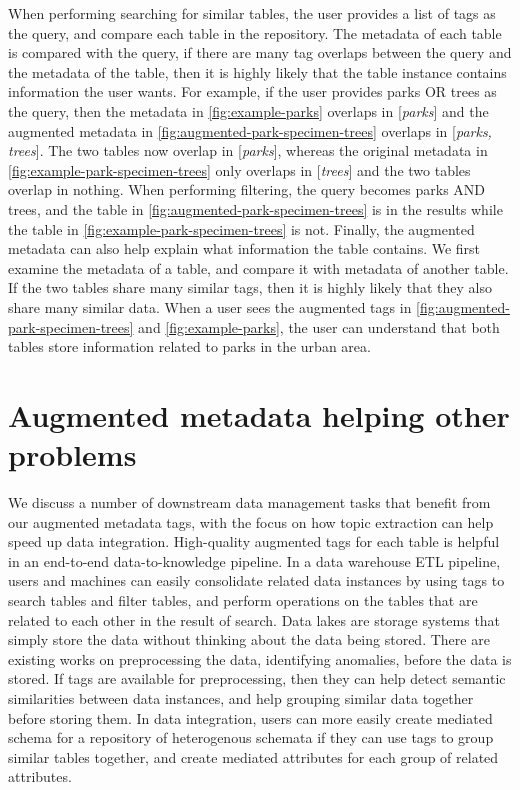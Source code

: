 When performing searching for similar tables, the user provides a list of tags as the query, and compare each table in the repository. The metadata of each table is compared with the query, if there are many tag overlaps between the query and the metadata of the table, then it is highly likely that the table instance contains information the user wants. For example, if the user provides parks OR trees as the query, then the metadata in \autoref{fig:example-parks} overlaps in [\textit{parks}] and the augmented metadata in \autoref{fig:augmented-park-specimen-trees} overlaps in [\textit{parks, trees}]. The two tables now overlap in [\textit{parks}], whereas the original metadata in \autoref{fig:example-park-specimen-trees} only overlaps in [\textit{trees}] and the two tables overlap in nothing. When performing filtering, the query becomes parks AND trees, and the table in \autoref{fig:augmented-park-specimen-trees} is in the results while the table in \autoref{fig:example-park-specimen-trees} is not. Finally, the augmented metadata can also help explain what information the table contains. We first examine the metadata of a table, and compare it with metadata of another table. If the two tables share many similar tags, then it is highly likely that they also share many similar data. When a user sees the augmented tags in \autoref{fig:augmented-park-specimen-trees} and \autoref{fig:example-parks}, the user can understand that both tables store information related to parks in the urban area.

\section{Augmented metadata helping other problems}
\label{sec:AugmentedMetadataHelpingOtherProblems}

We discuss a number of downstream data management tasks that benefit from our augmented metadata tags, with the focus on how topic extraction can help speed up data integration. High-quality augmented tags for each table is helpful in an end-to-end data-to-knowledge pipeline. In a data warehouse ETL pipeline, users and machines can easily consolidate related data instances by using tags to search tables and filter tables, and perform operations on the tables that are related to each other in the result of search. Data lakes are storage systems that simply store the data without thinking about the data being stored. There are existing works on preprocessing the data, identifying anomalies, before the data is stored. If tags are available for preprocessing, then they can help detect semantic similarities between data instances, and help grouping similar data together before storing them. In data integration, users can more easily create mediated schema for a repository of heterogenous schemata if they can use tags to group similar tables together, and create mediated attributes for each group of related attributes.

